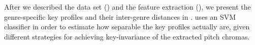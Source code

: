\documentclass{article}
\begin{document}
After we described the data set () and the feature extraction (), we present the genre-specific key profiles and their inter-genre distances in .  uses an SVM classifier in order to estimate how separable the key profiles actually are, given different strategies for achieving key-invariance of the extracted pitch chromas.

\end{document}
